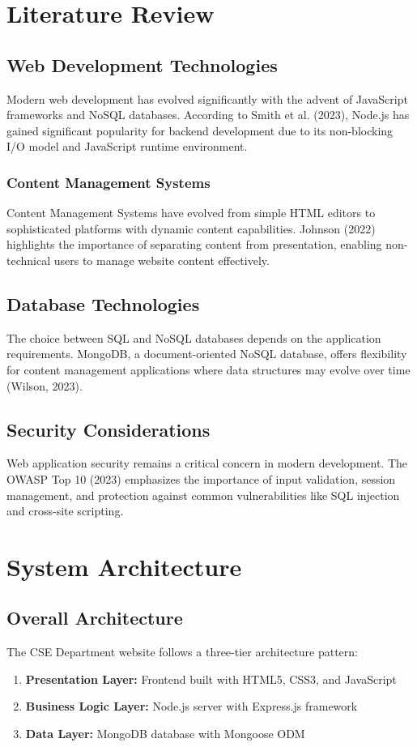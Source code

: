 \documentclass[12pt,a4paper]{report}
\begin{document}
\chapter{Literature Review}
\label{chap:literature}

\section{Web Development Technologies}
Modern web development has evolved significantly with the advent of JavaScript frameworks and NoSQL databases. According to Smith et al. (2023), Node.js has gained significant popularity for backend development due to its non-blocking I/O model and JavaScript runtime environment.

\subsection{Content Management Systems}
Content Management Systems have evolved from simple HTML editors to sophisticated platforms with dynamic content capabilities. Johnson (2022) highlights the importance of separating content from presentation, enabling non-technical users to manage website content effectively.

\section{Database Technologies}
The choice between SQL and NoSQL databases depends on the application requirements. MongoDB, a document-oriented NoSQL database, offers flexibility for content management applications where data structures may evolve over time (Wilson, 2023).

\section{Security Considerations}
Web application security remains a critical concern in modern development. The OWASP Top 10 (2023) emphasizes the importance of input validation, session management, and protection against common vulnerabilities like SQL injection and cross-site scripting.

\chapter{System Architecture}
\label{chap:architecture}

\section{Overall Architecture}
The CSE Department website follows a three-tier architecture pattern:
\begin{enumerate}
    \item \textbf{Presentation Layer:} Frontend built with HTML5, CSS3, and JavaScript
    \item \textbf{Business Logic Layer:} Node.js server with Express.js framework
    \item \textbf{Data Layer:} MongoDB database with Mongoose ODM
\end{enumerate}
\end{document}
